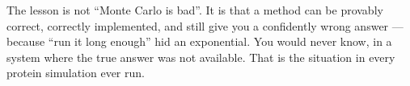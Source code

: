 \begin{plain}
The lesson is not ``Monte Carlo is bad''. It is that a method can be provably correct, correctly
implemented, and still give you a confidently wrong answer --- because ``run it long enough'' hid an
exponential. You would never know, in a system where the true answer was not available. That is the
situation in every protein simulation ever run.
\end{plain}
